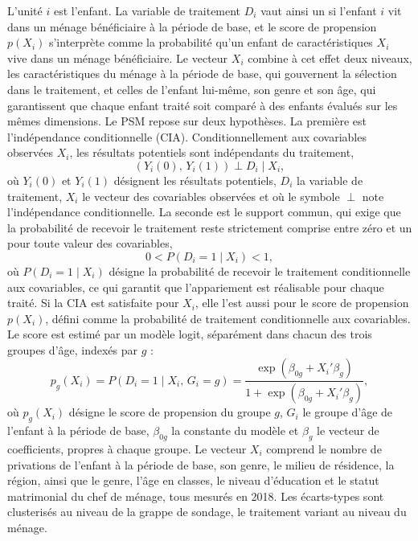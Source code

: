 L'unité $i$ est l'enfant. La variable de traitement $D_i$ vaut ainsi un si l'enfant $i$
vit dans un ménage bénéficiaire à la période de base, et le score de propension
$p(X_i)$ s'interprète comme la probabilité qu'un enfant de caractéristiques
$X_i$ vive dans un ménage bénéficiaire. Le vecteur $X_i$
combine à cet effet deux niveaux, les caractéristiques du ménage à la période
de base, qui gouvernent la sélection dans le traitement, et celles de l'enfant
lui-même, son genre et son âge, qui garantissent que chaque enfant traité
soit comparé à des enfants évalués sur les mêmes dimensions. Le PSM repose sur deux hypothèses. La première est l'indépendance
conditionnelle (CIA). Conditionnellement aux covariables observées $X_i$,
les résultats potentiels sont indépendants du traitement,
\begin{equation}
  \left(Y_i(0),\, Y_i(1)\right) \perp D_i \mid X_i,
  \label{eq:cia}
\end{equation}
où $Y_i(0)$ et $Y_i(1)$ désignent les résultats potentiels, $D_i$ la
variable de traitement, $X_i$ le vecteur des covariables observées et où
le symbole $\perp$ note l'indépendance conditionnelle. La seconde est le
support commun, qui exige que la probabilité de recevoir
le traitement reste strictement comprise entre zéro et un pour toute
valeur des covariables,
\begin{equation}
  0 < P(D_i = 1 \mid X_i) < 1,
  \label{eq:support}
\end{equation}
où $P(D_i = 1 \mid X_i)$ désigne la probabilité de recevoir le traitement
conditionnelle aux covariables, ce qui garantit que l'appariement est
réalisable pour chaque traité.
Si la CIA est satisfaite pour $X_i$, elle l'est aussi pour le score de
propension $p(X_i)$, défini comme la probabilité de traitement
conditionnelle aux covariables.
Le score est estimé par un modèle logit, séparément dans chacun des trois
groupes d'âge, indexés par $g$ :
\begin{equation}
  p_g(X_i) = P\left(D_i = 1 \mid X_i,\, G_i = g\right)
           = \frac{\exp\left(\beta_{0g} + X_i'\beta_g\right)}
                  {1 + \exp\left(\beta_{0g} + X_i'\beta_g\right)},
  \label{eq:logit}
\end{equation}
où $p_g(X_i)$ désigne le score de propension du groupe $g$, $G_i$ le
groupe d'âge de l'enfant à la période de base, $\beta_{0g}$ la constante
du modèle et $\beta_g$ le vecteur de coefficients, propres à chaque
groupe. Le vecteur $X_i$
comprend le nombre de privations de l'enfant à la période de base, son
genre, le milieu de résidence, la région, ainsi que le genre, l'âge en
classes, le niveau d'éducation et le statut matrimonial du chef de ménage,
tous mesurés en 2018. Les écarts-types sont clusterisés
au niveau de la grappe de sondage, le traitement variant au niveau du
ménage.

